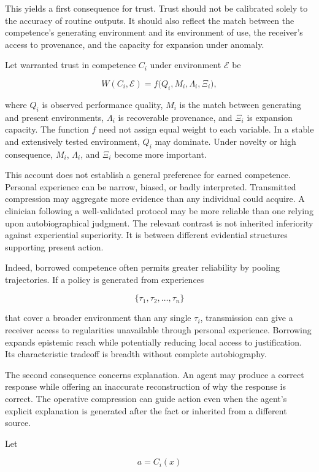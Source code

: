 \documentclass[11pt]{article}
\begin{document}
This yields a first consequence for trust. Trust should not be calibrated solely to the accuracy of routine outputs. It should also reflect the match between the competence's generating environment and its environment of use, the receiver's access to provenance, and the capacity for expansion under anomaly.

Let warranted trust in competence $C_i$ under environment $\mathcal{E}$ be

\[
W(C_i,\mathcal{E})
=
f\bigl(
Q_i,
M_i,
\Lambda_i,
\Xi_i
\bigr),
\]

where $Q_i$ is observed performance quality, $M_i$ is the match between generating and present environments, $\Lambda_i$ is recoverable provenance, and $\Xi_i$ is expansion capacity. The function $f$ need not assign equal weight to each variable. In a stable and extensively tested environment, $Q_i$ may dominate. Under novelty or high consequence, $M_i$, $\Lambda_i$, and $\Xi_i$ become more important.

This account does not establish a general preference for earned competence. Personal experience can be narrow, biased, or badly interpreted. Transmitted compression may aggregate more evidence than any individual could acquire. A clinician following a well-validated protocol may be more reliable than one relying upon autobiographical judgment. The relevant contrast is not inherited inferiority against experiential superiority. It is between different evidential structures supporting present action.

Indeed, borrowed competence often permits greater reliability by pooling trajectories. If a policy is generated from experiences

\[
\{\tau_1,\tau_2,\ldots,\tau_n\}
\]

that cover a broader environment than any single $\tau_i$, transmission can give a receiver access to regularities unavailable through personal experience. Borrowing expands epistemic reach while potentially reducing local access to justification. Its characteristic tradeoff is breadth without complete autobiography.

The second consequence concerns explanation. An agent may produce a correct response while offering an inaccurate reconstruction of why the response is correct. The operative compression can guide action even when the agent's explicit explanation is generated after the fact or inherited from a different source.

Let

\[
a=C_i(x)
\]
\end{document}
